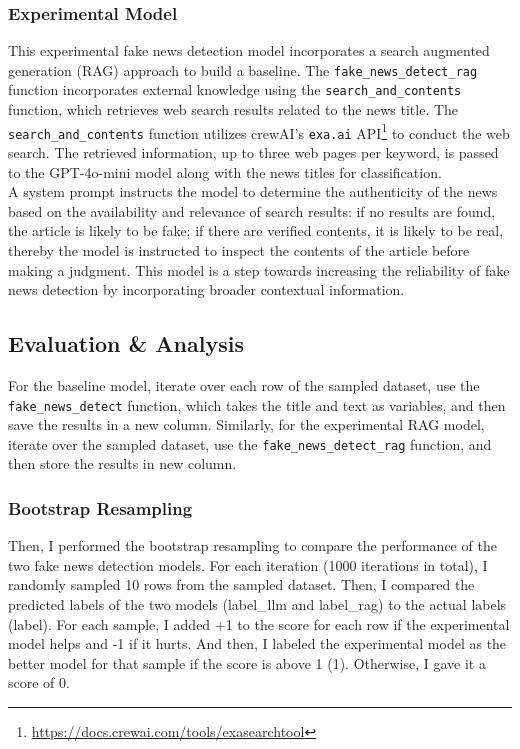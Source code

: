 \documentclass[11pt]{article}
\begin{document}
\subsubsection{Experimental Model}
This experimental fake news detection model incorporates a search augmented generation (RAG) approach to build a baseline. The \texttt{fake\_news\_detect\_rag} function incorporates external knowledge using the \texttt{search\_and\_contents} function, which retrieves web search results related to the news title. The \texttt{search\_and\_contents} function utilizes crewAI's \texttt{exa.ai} API\footnote{\url{https://docs.crewai.com/tools/exasearchtool}} to conduct the web search. The retrieved information, up to three web pages per keyword, is passed to the GPT-4o-mini model along with the news titles for classification.\\
A system prompt instructs the model to determine the authenticity of the news based on the availability and relevance of search results:  if no results are found, the article is likely to be fake; if there are verified contents, it is likely to be real, thereby the model is instructed to inspect the contents of the article before making a judgment. This model is a step towards increasing the reliability of fake news detection by incorporating broader contextual information.
\subsection{Evaluation \& Analysis}
For the baseline model, iterate over each row of the sampled dataset, use the \texttt{fake\_news\_detect} function, which takes the title and text as variables, and then save the results in a new column. Similarly, for the experimental RAG model, iterate over the sampled dataset, use the \texttt{fake\_news\_detect\_rag} function, and then store the results in new column. 
\subsubsection{Bootstrap Resampling}
Then, I performed the bootstrap resampling to compare the performance of the two fake news detection models. For each iteration (1000 iterations in total), I randomly sampled 10 rows from the sampled dataset. Then, I compared the predicted labels of the two models (label\_llm and label\_rag) to the actual labels (label). For each sample, I added +1 to the score for each row if the experimental model helps and -1 if it hurts. And then, I labeled the experimental model as the better model for that sample if the score is above 1 (1). Otherwise, I gave it a score of 0. 
\end{document}
